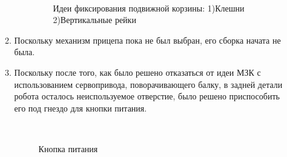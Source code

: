 \begin{enumerate}
\begin{enumerate}
\begin{enumerate}
			\begin{figure}[H]
				\begin{minipage}[h]{0.2\linewidth}
					\center  
				\end{minipage}
				\begin{minipage}[h]{0.6\linewidth}
					\caption{Идеи фиксирования подвижной корзины: 1)Клешни 2)Вертикальные рейки %
						}
				\end{minipage}
			\end{figure}
			
		\end{enumerate}
		
		\item Поскольку механизм прицепа пока не был выбран, его сборка начата не была.
		
		\item Поскольку после того, как было решено отказаться от идеи МЗК с использованием сервопривода, поворачивающего балку, в задней детали робота осталось неиспользуемое отверстие, было решено приспособить его под гнездо для кнопки питания.
		
		\begin{figure}[H]
			\begin{minipage}[h]{0.2\linewidth}
				\center  
			\end{minipage}
			\begin{minipage}[h]{0.6\linewidth}
				\caption{Кнопка питания}
			\end{minipage}
		\end{figure}
		

\end{enumerate}
\end{enumerate}
